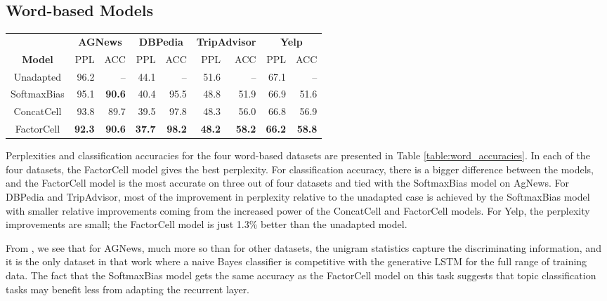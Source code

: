 \subsection{Word-based Models}
\label{sec:word_based_models}

\begin{table*}[h!]
\centering
\begin{tabular}{c|rr|rr|rr|rr}
 & \multicolumn{2}{c|}{\textbf{AGNews}} & \multicolumn{2}{c|}{\textbf{DBPedia}} & \multicolumn{2}{c|}{\textbf{TripAdvisor}} & \multicolumn{2}{c}{\textbf{Yelp}} \\
\textbf{Model} & PPL & ACC & PPL & ACC & PPL & ACC & PPL & ACC \\ \hline
Unadapted & 96.2 & -- & 44.1 & -- & 51.6 & -- & 67.1 & -- \\
SoftmaxBias & 95.1 & \textbf{90.6} & 40.4 & 95.5 & 48.8 & 51.9 & 66.9 & 51.6 \\
ConcatCell & 93.8 & 89.7 & 39.5 & 97.8 & 48.3 & 56.0 & 66.8 & 56.9 \\
FactorCell & \textbf{92.3} & \textbf{90.6} & \textbf{37.7} & \textbf{98.2} & \textbf{48.2} & \textbf{58.2} & \textbf{66.2} & \textbf{58.8} \\
\end{tabular}
\caption{Perplexity and classification accuracy on the test set for the four word-based datasets.}
\label{table:word_accuracies}
\end{table*}

Perplexities and classification accuracies for the four word-based datasets are presented in Table \ref{table:word_accuracies}. In each of the four datasets, the FactorCell model gives the best perplexity. For classification accuracy, there is a bigger difference between the models, and the FactorCell model is the most accurate on three out of four datasets and tied with the SoftmaxBias model on AgNews. For DBPedia and TripAdvisor, most of the improvement in perplexity relative to the unadapted case is achieved by the SoftmaxBias model with smaller relative improvements coming from the increased power of the ConcatCell and FactorCell models. For Yelp, the perplexity improvements are small; the FactorCell model is just 1.3\% better than the unadapted model.

From , we see that for AGNews, much more so than for other datasets, the unigram statistics capture the discriminating information, and it is the only dataset in that work where a naive Bayes classifier is competitive with the generative LSTM for the full range of training data. The fact that the SoftmaxBias model gets the same accuracy as the FactorCell model 
on this task suggests that topic classification tasks may benefit less from adapting the recurrent layer.


